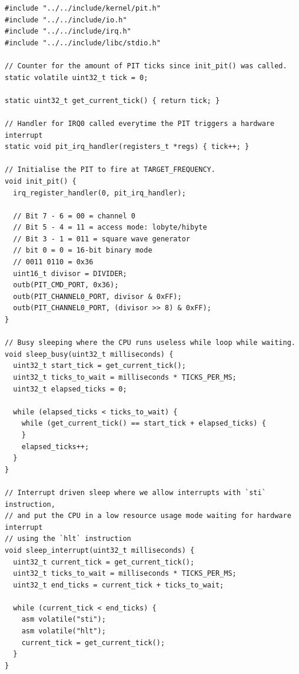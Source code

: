 \documentclass[../main.tex]{subfiles}
\begin{document}
\label{lst:pit_c}
\begin{verbatim}
#include "../../include/kernel/pit.h"
#include "../../include/io.h"
#include "../../include/irq.h"
#include "../../include/libc/stdio.h"

// Counter for the amount of PIT ticks since init_pit() was called.
static volatile uint32_t tick = 0;

static uint32_t get_current_tick() { return tick; }

// Handler for IRQ0 called everytime the PIT triggers a hardware interrupt
static void pit_irq_handler(registers_t *regs) { tick++; }

// Initialise the PIT to fire at TARGET_FREQUENCY.
void init_pit() {
  irq_register_handler(0, pit_irq_handler);

  // Bit 7 - 6 = 00 = channel 0
  // Bit 5 - 4 = 11 = access mode: lobyte/hibyte
  // Bit 3 - 1 = 011 = square wave generator
  // bit 0 = 0 = 16-bit binary mode
  // 0011 0110 = 0x36
  uint16_t divisor = DIVIDER;
  outb(PIT_CMD_PORT, 0x36);
  outb(PIT_CHANNEL0_PORT, divisor & 0xFF);
  outb(PIT_CHANNEL0_PORT, (divisor >> 8) & 0xFF);
}

// Busy sleeping where the CPU runs useless while loop while waiting.
void sleep_busy(uint32_t milliseconds) {
  uint32_t start_tick = get_current_tick();
  uint32_t ticks_to_wait = milliseconds * TICKS_PER_MS;
  uint32_t elapsed_ticks = 0;

  while (elapsed_ticks < ticks_to_wait) {
    while (get_current_tick() == start_tick + elapsed_ticks) {
    }
    elapsed_ticks++;
  }
}

// Interrupt driven sleep where we allow interrupts with `sti` instruction,
// and put the CPU in a low resource usage mode waiting for hardware interrupt
// using the `hlt` instruction
void sleep_interrupt(uint32_t milliseconds) {
  uint32_t current_tick = get_current_tick();
  uint32_t ticks_to_wait = milliseconds * TICKS_PER_MS;
  uint32_t end_ticks = current_tick + ticks_to_wait;

  while (current_tick < end_ticks) {
    asm volatile("sti");
    asm volatile("hlt");
    current_tick = get_current_tick();
  }
}

\end{verbatim}
\end{document}
